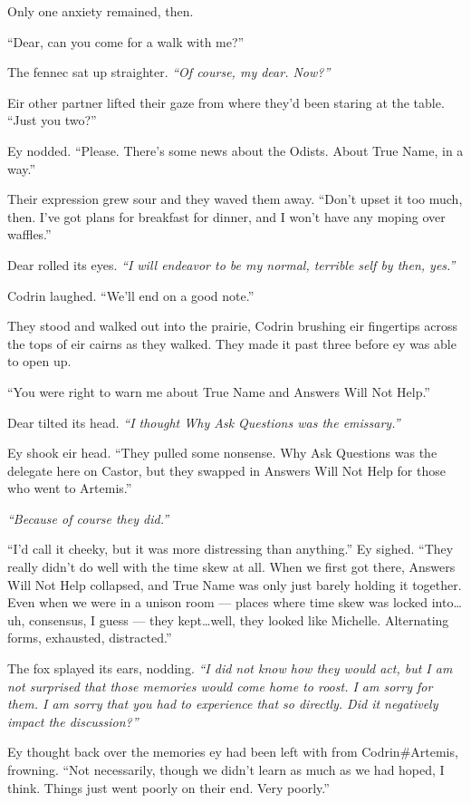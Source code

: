 Only one anxiety remained, then.

``Dear, can you come for a walk with me?''

The fennec sat up straighter. \emph{``Of course, my dear. Now?''}

Eir other partner lifted their gaze from where they'd been staring at the table. ``Just you two?''

Ey nodded. ``Please. There's some news about the Odists. About True Name, in a way.''

Their expression grew sour and they waved them away. ``Don't upset it too much, then. I've got plans for breakfast for dinner, and I won't have any moping over waffles.''

Dear rolled its eyes. \emph{``I will endeavor to be my normal, terrible self by then, yes.''}

Codrin laughed. ``We'll end on a good note.''

They stood and walked out into the prairie, Codrin brushing eir fingertips across the tops of eir cairns as they walked. They made it past three before ey was able to open up.

``You were right to warn me about True Name and Answers Will Not Help.''

Dear tilted its head. \emph{``I thought Why Ask Questions was the emissary.''}

Ey shook eir head. ``They pulled some nonsense. Why Ask Questions was the delegate here on Castor, but they swapped in Answers Will Not Help for those who went to Artemis.''

\emph{``Because of course they did.''}

``I'd call it cheeky, but it was more distressing than anything.'' Ey sighed. ``They really didn't do well with the time skew at all. When we first got there, Answers Will Not Help collapsed, and True Name was only just barely holding it together. Even when we were in a unison room — places where time skew was locked into\ldots uh, consensus, I guess — they kept\ldots well, they looked like Michelle. Alternating forms, exhausted, distracted.''

The fox splayed its ears, nodding. \emph{``I did not know how they would act, but I am not surprised that those memories would come home to roost. I am sorry for them. I am sorry that you had to experience that so directly. Did it negatively impact the discussion?''}

Ey thought back over the memories ey had been left with from Codrin\#Artemis, frowning. ``Not necessarily, though we didn't learn as much as we had hoped, I think. Things just went poorly on their end. Very poorly.''

